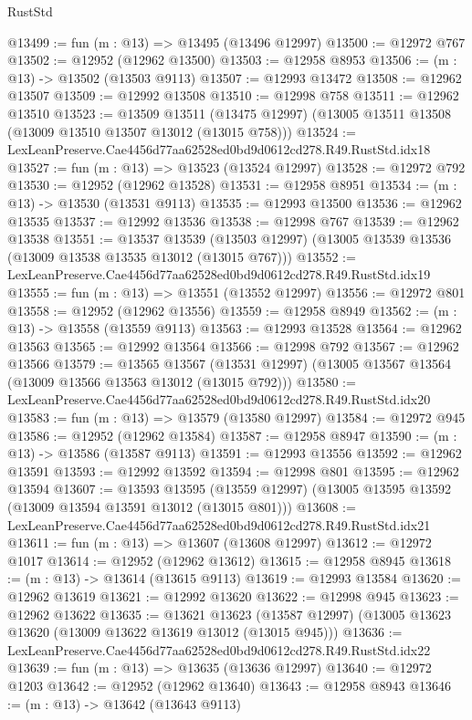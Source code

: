 \begin{lexlean}{RustStd}
\begin{coremodule}
@13499 := fun (m : @13) => @13495 (@13496 @12997)
@13500 := @12972 @767
@13502 := @12952 (@12962 @13500)
@13503 := @12958 @8953
@13506 := (m : @13) -> @13502 (@13503 @9113)
@13507 := @12993 @13472
@13508 := @12962 @13507
@13509 := @12992 @13508
@13510 := @12998 @758
@13511 := @12962 @13510
@13523 := @13509
    @13511
    (@13475 @12997)
    (@13005 @13511 @13508 (@13009 @13510 @13507 @13012 (@13015 @758)))
@13524 := LexLeanPreserve.Cae4456d77aa62528ed0bd9d0612cd278.R49.RustStd.idx18
@13527 := fun (m : @13) => @13523 (@13524 @12997)
@13528 := @12972 @792
@13530 := @12952 (@12962 @13528)
@13531 := @12958 @8951
@13534 := (m : @13) -> @13530 (@13531 @9113)
@13535 := @12993 @13500
@13536 := @12962 @13535
@13537 := @12992 @13536
@13538 := @12998 @767
@13539 := @12962 @13538
@13551 := @13537
    @13539
    (@13503 @12997)
    (@13005 @13539 @13536 (@13009 @13538 @13535 @13012 (@13015 @767)))
@13552 := LexLeanPreserve.Cae4456d77aa62528ed0bd9d0612cd278.R49.RustStd.idx19
@13555 := fun (m : @13) => @13551 (@13552 @12997)
@13556 := @12972 @801
@13558 := @12952 (@12962 @13556)
@13559 := @12958 @8949
@13562 := (m : @13) -> @13558 (@13559 @9113)
@13563 := @12993 @13528
@13564 := @12962 @13563
@13565 := @12992 @13564
@13566 := @12998 @792
@13567 := @12962 @13566
@13579 := @13565
    @13567
    (@13531 @12997)
    (@13005 @13567 @13564 (@13009 @13566 @13563 @13012 (@13015 @792)))
@13580 := LexLeanPreserve.Cae4456d77aa62528ed0bd9d0612cd278.R49.RustStd.idx20
@13583 := fun (m : @13) => @13579 (@13580 @12997)
@13584 := @12972 @945
@13586 := @12952 (@12962 @13584)
@13587 := @12958 @8947
@13590 := (m : @13) -> @13586 (@13587 @9113)
@13591 := @12993 @13556
@13592 := @12962 @13591
@13593 := @12992 @13592
@13594 := @12998 @801
@13595 := @12962 @13594
@13607 := @13593
    @13595
    (@13559 @12997)
    (@13005 @13595 @13592 (@13009 @13594 @13591 @13012 (@13015 @801)))
@13608 := LexLeanPreserve.Cae4456d77aa62528ed0bd9d0612cd278.R49.RustStd.idx21
@13611 := fun (m : @13) => @13607 (@13608 @12997)
@13612 := @12972 @1017
@13614 := @12952 (@12962 @13612)
@13615 := @12958 @8945
@13618 := (m : @13) -> @13614 (@13615 @9113)
@13619 := @12993 @13584
@13620 := @12962 @13619
@13621 := @12992 @13620
@13622 := @12998 @945
@13623 := @12962 @13622
@13635 := @13621
    @13623
    (@13587 @12997)
    (@13005 @13623 @13620 (@13009 @13622 @13619 @13012 (@13015 @945)))
@13636 := LexLeanPreserve.Cae4456d77aa62528ed0bd9d0612cd278.R49.RustStd.idx22
@13639 := fun (m : @13) => @13635 (@13636 @12997)
@13640 := @12972 @1203
@13642 := @12952 (@12962 @13640)
@13643 := @12958 @8943
@13646 := (m : @13) -> @13642 (@13643 @9113)

\end{coremodule}
\end{lexlean}
